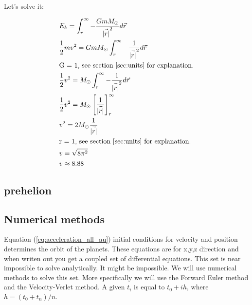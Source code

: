 Let's solve it: 

\begin{align*}
	&E_k =\int_r^\infty -\frac{GmM_\odot}{\vec{|r|}^2} d\vec{r}
	\\
	&\frac{1}{2}mv^2 = GmM_\odot \int_r^\infty -\frac{1}{\vec{|r|}^2} d\vec{r}
	\\
	&\text{G = 1, see section \ref{sec:units} for explanation.}
	\\
	&\frac{1}{2}v^2 = M_\odot \int_r^\infty -\frac{1}{\vec{|r|}^2} d\vec{r}
	\\
	&\frac{1}{2}v^2 = M_\odot \left[ \frac{1}{\vec{|r|}} \right]_r^\infty
	\\
	&v^2 = 2M_\odot \frac{1}{\vec{|r|}}
	\\
	&\text{r = 1, see section \ref{sec:units} for explanation.}
	\\
	&v = \sqrt{8\pi^2}
	\\
	&v \approx 8.88
\end{align*}








\subsection{prehelion}


















\subsection{Numerical methods}

Equation (\ref{eq:acceleration_all_au}) initial conditions for velocity and position determines the orbit of the planets. 
These equations are for x,y,z direction and when writen out you get a coupled set of differential equations. This set is near impossible to solve analytically. It might be impossible. We will use numerical methods to solve this set. More specifically we will use the Forward Euler method and the Velocity-Verlet method. A given $t_i$ is equal to $t_0 + ih$, where $h = (t_{0} + t_{n})/n $.

